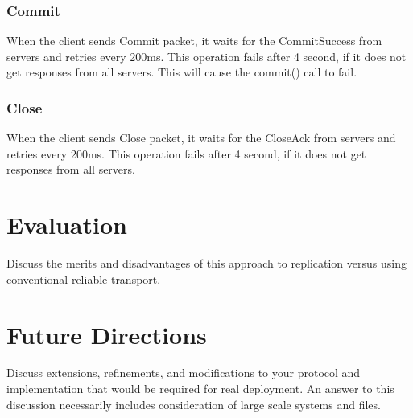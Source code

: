 \documentclass[11pt]{article} %
\begin{document}
\subsubsection{Commit}
When the client sends Commit packet, it waits for the CommitSuccess from servers
and retries every 200ms.
This operation fails after 4 second, if it does not get responses from all servers.
This will cause the commit() call to fail.

\subsubsection{Close}
When the client sends Close packet, it waits for the CloseAck from servers
and retries every 200ms.
This operation fails after 4 second, if it does not get responses from all servers.

\section{Evaluation}
Discuss the merits and disadvantages of this approach to replication versus using conventional reliable transport.

\section{Future Directions}
Discuss extensions, refinements, and modifications to your protocol and implementation that would be required for real deployment. An answer to this discussion necessarily includes consideration of large scale systems and files.
\end{document}
